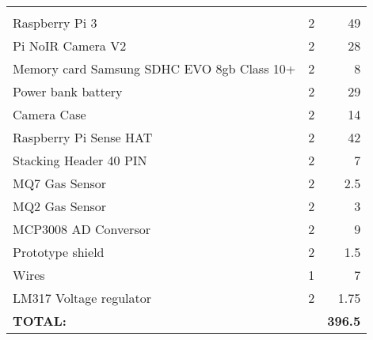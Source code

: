 \begin{tabular}{ |p{}P{.1\textwidth}r|}
	\hline
	 \\
	\hline
	\hline
		& 	&  \\
	\hline
	Raspberry Pi 3 					& 2 	& 49 \\ 
	\hline
	Pi NoIR Camera V2 				& 2 	& 28 \\ 
	\hline
	Memory card Samsung SDHC
	EVO 8gb Class 10+ 				& 2		& 8 \\ 
	\hline
	Power bank battery 				& 2 	& 29 \\ 
	\hline
	Camera Case		 				& 2 	& 14 \\ 
	\hline
	Raspberry Pi Sense HAT			& 2 	& 42 \\ 
	\hline
	Stacking Header 40 PIN 			& 2 	& 7 \\ 
	\hline
	MQ7 Gas Sensor		 			& 2 	& 2.5 \\ 
	\hline
	MQ2 Gas Sensor 					& 2 	& 3 \\ 
	\hline
	MCP3008 AD Conversor			& 2 	& 9 \\ 
	\hline
	Prototype shield  				& 2 	& 1.5 \\ 
	\hline
	Wires 							& 1 	& 7 \\ 
	\hline
	LM317 Voltage regulator 		& 2 	& 1.75 \\ 
	
	\Xhline{3\arrayrulewidth}
	\textbf{TOTAL:} &  		& \textbf{396.5} \\ 
	\hline

\end{tabular}
